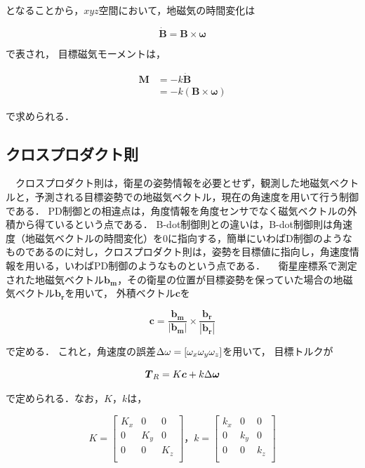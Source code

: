 となることから，$xyz$空間において，地磁気の時間変化は

\begin{equation}
    \boldsymbol{\dot{B} = B \times \omega}
\end{equation}

で表され，
目標磁気モーメントは，

\begin{equation}
    \begin{aligned}
        \boldsymbol{M} &= -k \boldsymbol{\dot{B}}\\
                       &= -k(\boldsymbol{B \times \omega})
    \end{aligned}
\end{equation}

で求められる．

\subsection{クロスプロダクト則}
　クロスプロダクト則は，衛星の姿勢情報を必要とせず，観測した地磁気ベクトルと，予測される目標姿勢での地磁気ベクトル，現在の角速度を用いて行う制御である．
PD制御との相違点は，角度情報を角度センサでなく磁気ベクトルの外積から得ているという点である．
B-dot制御則との違いは，B-dot制御則は角速度（地磁気ベクトルの時間変化）を0に指向する，簡単にいわばD制御のようなものであるのに対し，クロスプロダクト則は，姿勢を目標値に指向し，角速度情報を用いる，いわばPD制御のようなものという点である．
　衛星座標系で測定された地磁気ベクトル$\boldsymbol{b_m}$，その衛星の位置が目標姿勢を保っていた場合の地磁気ベクトル$\boldsymbol{b_r}$を用いて，
外積ベクトル$\boldsymbol{c}$を

\begin{equation}
    \boldsymbol{c} = \boldsymbol{\frac{b_m}{|b_m|}\times\frac{b_r}{|b_r|}}
\end{equation}

で定める．
これと，角速度の誤差$\Delta\omega = [\omega_x\space\omega_y\space\omega_z]$を用いて，
目標トルクが

\begin{equation}
    \boldsymbol{T}_R = K\boldsymbol{c}+k\Delta\boldsymbol{\omega}\\
\end{equation}

で定められる．なお，$K，k$は，

\begin{equation}
    K = 
    \begin{bmatrix}
        K_x & 0 & 0 \\
        0 & K_y & 0 \\
        0 & 0 & K_z \\
    \end{bmatrix}
    ，k =
    \begin{bmatrix}
        k_x & 0 & 0 \\
        0 & k_y & 0 \\
        0 & 0 & k_z \\
    \end{bmatrix}
\end{equation}

